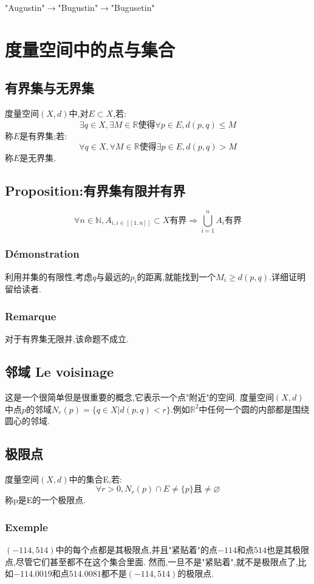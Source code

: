 \documentclass[12pt, a4paper, oneside]{ctexbook}
\newcommand{\R }{\mathbb{R}}%
\begin{document}
  "Augustin"$\rightarrow$"Bugustin"$\rightarrow$"Bugusetin"


\section{度量空间中的点与集合}
  \subsection{有界集与无界集}
  度量空间$(X,d)$中,对$E\subset X$,若:
  $$
    \exists q\in X , \exists M\in \R\text{使得}\forall p\in E,d(p,q)\leq M
  $$称$E$是有界集;若:
  $$
    \forall q\in X , \forall M\in \R\text{使得}\exists p\in E,d(p,q)> M
  $$称$E$是无界集.
  \subsection{Proposition:有界集有限并有界}
  $$
  \forall n\in \mathbb{N},A_{i,i\in [\![1,n]\!]}\subset X\text{有界}\Rightarrow \bigcup_{i=1}^n A_i\text{有界}
  $$
  \subsubsection{Démonstration}
  利用并集的有限性,考虑$q$与最远的$p_i$的距离,就能找到一个$M_i\ge d(p,q)$.详细证明留给读者.
  \subsubsection{Remarque}
  对于有界集无限并,该命题不成立.

  \subsection{邻域 Le voisinage}     \label{myref:voisinage}
  这是一个很简单但是很重要的概念,它表示一个点"附近"的空间.
  度量空间$(X,d)$中点$p$的邻域$N_r(p)=\{q\in X | d(p,q)<r\}$.例如$\R^2$中任何一个圆的内部都是围绕圆心的邻域.
  \subsection{极限点}
  度量空间$(X,d)$中的集合E,若:
  $$
  \forall r>0, N_r(p)\cap E\neq\{p\}\mbox{且}\neq\varnothing 
  $$
  称p是E的一个极限点.
  \subsubsection{Exemple}
  $(-114,514)$中的每个点都是其极限点,并且"紧贴着"的点$-114$和点$514$也是其极限点,尽管它们甚至都不在这个集合里面.
  然而,一旦不是"紧贴着",就不是极限点了,比如$-114.0019$和点$514.0081$都不是$(-114,514)$的极限点.
\end{document}
